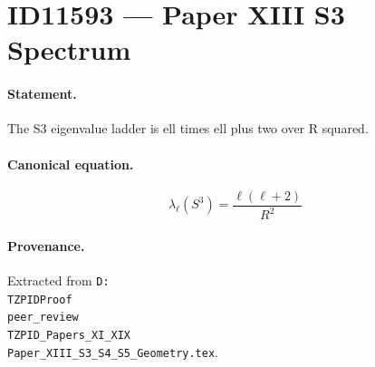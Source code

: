 \section*{ID11593 --- Paper XIII S3 Spectrum}

\paragraph{Statement.}
The S3 eigenvalue ladder is ell times ell plus two over R squared.

\paragraph{Canonical equation.}
\[
\lambda_\ell(S^3)=\frac{\ell(\ell+2)}{R^2}
\]

\paragraph{Provenance.}
Extracted from \texttt{D:\\TZPIDProof\\peer\_review\\TZPID\_Papers\_XI\_XIX\\Paper\_XIII\_S3\_S4\_S5\_Geometry.tex}.
